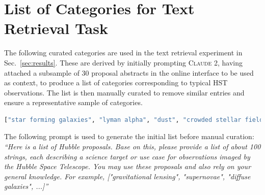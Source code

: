 \documentclass[10pt]{article} %
\begin{document}
\section{List of Categories for Text Retrieval Task}
\label{app:categories}

The following curated categories are used in the text retrieval experiment in Sec.~\ref{sec:results}.
%
These are derived by initially prompting \textsc{Claude 2}, having attached a subsample of 30 proposal abstracts in the online interface to be used as context, to produce a list of categories corresponding to typical HST observations. The list is then manually curated to remove similar entries and ensure a representative sample of categories. \\

\begin{lstlisting}[language=Python]
["star forming galaxies", "lyman alpha", "dust", "crowded stellar field", "core-collapse supernova", "cosmology", "gravitational lensing", "supernovae", "diffuse galaxies", "globular clusters", "stellar populations", "interstellar medium", "black holes", "dark matter", "galaxy clusters", "galaxy evolution", "galaxy formation", "quasars", "circumstellar disks", "exoplanets", "Kuiper Belt objects", "solar system objects", "cosmic web structure", "distant galaxies", "galaxy mergers", "galaxy interactions", "star formation", "stellar winds", "brown dwarfs", "white dwarfs", "nebulae", "star clusters", "galaxy archeology", "galactic structure", "active galactic nuclei", "gamma-ray bursts", "stellar nurseries", "intergalactic medium", "dark energy", "dwarf galaxies", "barred spiral galaxies", "irregular galaxies", "starburst galaxies", "low surface brightness galaxies", "ultra diffuse galaxies", "circumgalactic medium", "intracluster medium", "cosmic dust", "interstellar chemistry", "star formation histories", "initial mass function", "stellar proper motions", "binary star systems", "open clusters", "pre-main sequence stars", "protostars", "protoplanetary disks", "jets and outflows", "interstellar shocks", "planetary nebulae", "supernova remnants", "red giants", "Cepheid variables", "RR Lyrae variables", "stellar abundances", "stellar dynamics", "compact stellar remnants", "Einstein rings", "trans-Neptunian objects", "cosmic microwave background", "reionization epoch", "first stars", "first galaxies", "high-redshift quasars", "primordial black holes", "resolved binaries", "binary stars"]
\end{lstlisting}

The following prompt is used to generate the initial list before manual curation: \emph{``Here is a list of Hubble proposals. Base on this, please provide a list of about 100 strings, each describing a science target or use case for observations imaged by the Hubble Space Telescope. You may use these proposals and also rely on your general knowledge. For example, ["gravitational lensing", "supernovae", "diffuse galaxies", ...]''}
\end{document}

